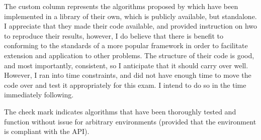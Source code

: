\documentclass[12pt,letterpaper]{exam}
\begin{document}
\begin{questions}
\begin{parts}
            The custom column represents the algorithms proposed by 
            \cite{zhong2024} which have been implemented in a library of 
            their own, which is publicly available, but standalone. 
            I appreciate that they made their code available, and provided
            instruction on hwo to reproduce their results, however,
            I do believe that there is benefit to conforming to the standards
            of a more popular framework in order to facilitate extension
            and application to other problems.
            The structure of their code is good, and most importantly, 
            consistent, so I anticipate that it should carry over well.
            However, I ran into time constraints, and did not have enough time
            to move the code over and test it appropriately for this exam.
            I intend to do so in the time immediately following.

            The check mark indicates algorithms that have been thoroughly
            tested and function without issue for arbitrary environments
            (provided that the environment is compliant with the API).


\end{parts}
\end{questions}
\end{document}
